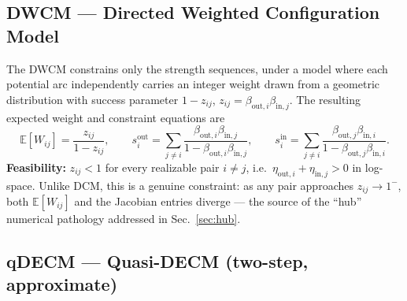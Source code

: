 \documentclass[10pt]{article}
\begin{document}
\subsection{DWCM --- Directed Weighted Configuration Model}
\label{sec:dwcm}

The DWCM constrains only the strength sequences, under a model where each
potential arc independently carries an integer weight drawn from a
geometric distribution with success parameter $1-z_{ij}$,
$z_{ij}=\beta_{\mathrm{out},i}\beta_{\mathrm{in},j}$. The resulting
expected weight and constraint equations are
\begin{equation}
\label{eq:dwcm}
\mathbb E[W_{ij}] = \frac{z_{ij}}{1-z_{ij}}, \qquad
s^{\mathrm{out}}_i = \sum_{j\ne i} \frac{\beta_{\mathrm{out},i}\beta_{\mathrm{in},j}}{1-\beta_{\mathrm{out},i}\beta_{\mathrm{in},j}}, \qquad
s^{\mathrm{in}}_i = \sum_{j\ne i} \frac{\beta_{\mathrm{out},j}\beta_{\mathrm{in},i}}{1-\beta_{\mathrm{out},j}\beta_{\mathrm{in},i}}.
\end{equation}
\textbf{Feasibility:} $z_{ij}<1$ for every realizable pair $i\ne j$, i.e.\
$\eta_{\mathrm{out},i}+\eta_{\mathrm{in},j}>0$ in log-space. Unlike DCM,
this is a genuine constraint: as any pair approaches $z_{ij}\to1^-$, both
$\mathbb E[W_{ij}]$ and the Jacobian entries diverge --- the source of the
``hub'' numerical pathology addressed in Sec.~\ref{sec:hub}.

\subsection{qDECM --- Quasi-DECM (two-step, approximate)}
\label{sec:qdecm}
\end{document}
